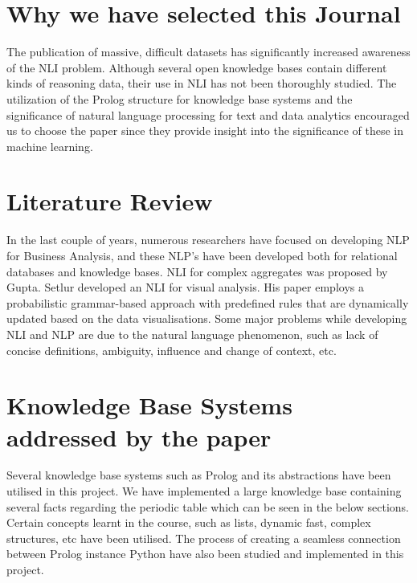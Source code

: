 \documentclass{article}
\begin{document}
\newpage
\section{Why we have selected this Journal}
The publication of massive, difficult datasets has significantly increased awareness of the NLI problem. Although several open knowledge bases contain different kinds of reasoning data, their use in NLI has not been thoroughly studied. The utilization of the Prolog structure for knowledge base systems and the significance of natural language processing for text and data analytics encouraged us to choose the paper since they provide insight into the significance of these in machine learning.


\section{Literature Review}
In the last couple of years, numerous researchers have focused on developing NLP for Business Analysis, and these NLP's have been developed both for relational databases and knowledge bases. NLI for complex aggregates was proposed by Gupta\cite{gupta2013complex}. Setlur\cite{setlur2016eviza} developed an NLI for visual analysis. His paper employs a probabilistic grammar-based approach with predefined rules that are dynamically updated based on the data visualisations. Some major problems while developing NLI and NLP are due to the natural language phenomenon, such as lack of concise definitions, ambiguity, influence and change of context, etc.

\section{Knowledge Base Systems addressed by the paper}
Several knowledge base systems such as Prolog and its abstractions have been utilised in this project. We have implemented a large knowledge base containing several facts regarding the periodic table which can be seen in the below sections. Certain concepts learnt in the course, such as lists, dynamic fast, complex structures, etc have been utilised. The process of creating a seamless connection between Prolog instance Python have also been studied and implemented in this project.
\end{document}
